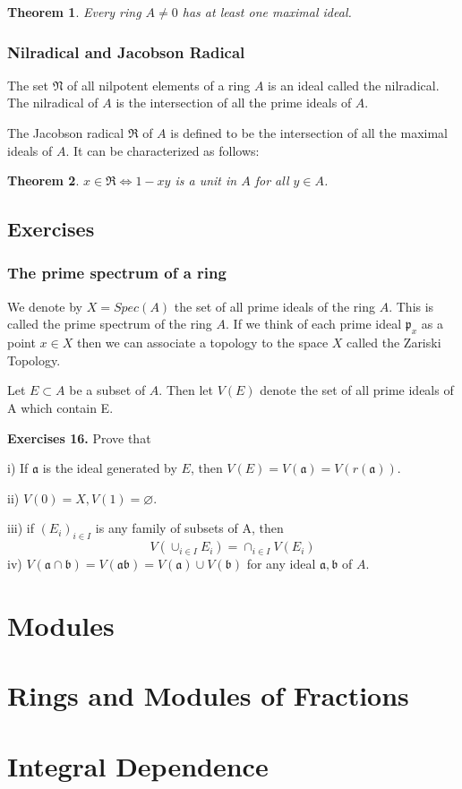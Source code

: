 \documentclass[]{report}
\newtheorem{theorem}{Theorem}[section]
\begin{document}
\begin{theorem}
    Every ring $A\neq 0$ has at least one maximal ideal.
\end{theorem}

\subsection{Nilradical and Jacobson Radical}

The set $\mathfrak{N}$ of all nilpotent elements of a ring $A$ is an ideal called the nilradical. The nilradical of $A$ is the intersection of all the prime ideals of $A$.

The Jacobson radical $\mathfrak{R}$ of $A$ is defined to be the intersection of all the maximal ideals of $A$. It can be characterized as follows:

\begin{theorem}
    $x\in \mathfrak{R} \Leftrightarrow 1-xy$ is a unit in $A$ for all $y\in A$.
\end{theorem}

\section{Exercises}
\subsection{The prime spectrum of a ring}

We denote by $X = Spec(A)$ the set of all prime ideals of the ring $A$. This is called the prime spectrum of the ring $A$. If we think of each prime ideal $\mathfrak{p}_x$ as a point $x\in X$ then we can associate a topology to the space $X$ called the Zariski Topology.

Let $E\subset A$ be a subset of $A$. Then let $V(E)$ denote the set of all prime ideals of A which contain E.

\textbf{Exercises 16.} Prove that

i) If $\mathfrak{a}$ is the ideal generated by $E$, then $V(E) = V(\mathfrak{a}) = V(r(\mathfrak{a}))$.

ii) $V(0) = X, V(1) = \varnothing$.

iii) if $(E_i)_{i\in I}$ is any family of subsets of A, then
$$V(\cup_{i\in I} E_i) = \cap_{i\in I} V(E_i)$$
iv) $V(\mathfrak{a\cap b}) = V(\mathfrak{ab}) = V(\mathfrak{a}) \cup V(\mathfrak{b})$ for any ideal $\mathfrak{a,b}$ of $A$.

\chapter{Modules}

\chapter{Rings and Modules of Fractions}

\chapter{Integral Dependence}

\begin{thebibliography}{9}
\end{thebibliography}
\end{document}
